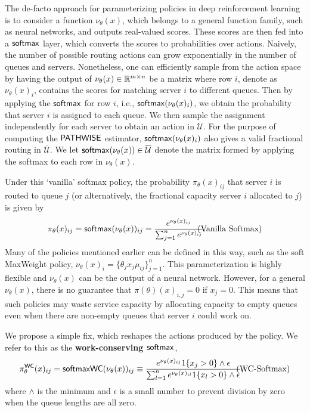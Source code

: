 The de-facto approach for parameterizing policies in deep reinforcement learning is to consider a function $\nu_{\theta}(x)$,
which belongs to a general function family, such as neural networks, and outputs real-valued scores.
These scores are then fed into a $\mathop{\mathsf{softmax}}$ layer, which converts the scores to probabilities over actions.
Naively, the number of possible routing actions can grow exponentially in the number of queues and servers.
Nonetheless, one can efficiently sample from the action space by having the output of
$\nu_{\theta}(x) \in \mathbb{R}^{m\times n}$ be a matrix where row $i$, denote as $\nu_{\theta}(x)_{i}$, contains the scores for matching server $i$ to different queues. Then by applying the $\mathop{\mathsf{softmax}}$ for row $i$, i.e., $\mathop{\mathsf{softmax}}(\nu_{\theta}(x)_{i})$, we obtain the probability that server $i$ is assigned to each queue. We then sample the assignment independently for each server to obtain an action in $\mathcal{U}$.
For the purpose of computing the $\mathsf{PATHWISE}$ estimator, $\mathop{\mathsf{softmax}}(\nu_{\theta}(x)_{i})$ also gives a valid fractional routing in $\overline{\mathcal{U}}$. We let $\mathop{\mathsf{softmax}}(\nu_{\theta}(x))\in \overline{\mathcal{U}}$ denote the matrix formed by applying the softmax to each row in $\nu_{\theta}(x)$.



Under this `vanilla' softmax policy, the probability $\pi_{\theta}(x)_{ij}$ that server $i$ is routed to queue $j$ 
(or alternatively, the fractional capacity server $i$ allocated to $j$) is given by
\begin{equation}
\label{eq:vanilla_softmax}
\pi_{\theta}(x)_{ij} = \softmax(\nu_{\theta}(x))_{ij} = \frac{e^{\nu_{\theta}(x)_{ij}}}{\sum_{j=1}^{n} e^{\nu_{\theta}(x)_{ij}}}. \hspace{-3em}
\tag{Vanilla Softmax}
\end{equation}
Many of the policies mentioned earlier can be defined in this way, such as the soft MaxWeight policy, $\nu_{\theta}(x)_{i} = \{ \theta_{j}x_{j}\mu_{ij}\}_{j=1}^{n}$. This parameterization is highly flexible
and $\nu_{\theta}(x)$
can be the output of a neural network. However, for a general $\nu_{\theta}(x)$,
there is no guarantee that $\pi(\theta)(x)_{i,j} = 0$ if $x_{j} = 0$. This means that such policies
may waste service capacity by allocating capacity to empty queues even when there are non-empty queues that 
server $i$ could work on.

We propose a simple fix, which reshapes the actions produced by the policy.
We refer to this as the {\bf work-conserving $\mathop{\mathsf{softmax}}$},
\begin{equation}
\label{eq:work-conserving}
    \pi_{\theta}^{\mathsf{WC}}(x)_{ij} = \mathsf{softmaxWC}(\nu_{\theta}(x))_{ij} \equiv \frac{e^{\nu_{\theta}(x)_{ij}}1\{x_{j} > 0\}\wedge \epsilon}
{\sum_{l=1}^{n} e^{\nu_{\theta}(x)_{il}}1\{x_{l} > 0\}\wedge \epsilon},
\hspace{-3em}
\tag{WC-Softmax}
\end{equation}
where $\wedge$ is the minimum and $\epsilon$ is a small number to prevent
division by zero when the queue lengths are all zero.

